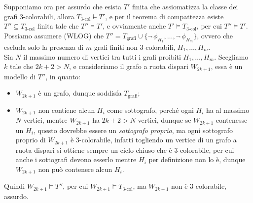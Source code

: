 \begin{soln}
\begin{enumerate}
\begin{center}
        \end{center}
        Supponiamo ora per assurdo che esista $T'$ finita che assiomatizza la classe dei grafi 3-colorabili, allora $T_{\text{3-col}} \models T'$, e per il teorema di compattezza esiste $T'' \subseteq T_{\text{3-col}}$ finita tale che $T'' \models T'$, e ovviamente anche $T' \models T_{\text{3-col}}$, per cui $T'' \models T'$.
        Possiamo assumere (WLOG) che $T'' = T_{\text{grafi}} \cup \{\neg\,\phi_{H_1}, \ldots, \neg\,\phi_{H_m}\}$, ovvero che escluda solo la presenza di $m$ grafi finiti non 3-colorabili, $H_1, \ldots, H_m$.\\
        Sia $N$ il massimo numero di vertici tra tutti i grafi proibiti $H_1, \ldots, H_m$. Scegliamo $k$ tale che $2k+2 > N$, e consideriamo il grafo a ruota dispari $W_{2k+1}$, essa è un modello di $T''$, in quanto:
        \begin{itemize}
            \item $W_{2k+1}$ è un grafo, dunque soddisfa $T_{\text{grafi}}$;
            \item $W_{2k+1}$ non contiene alcun $H_i$ come sottografo, perché ogni $H_i$ ha al massimo $N$ vertici, mentre $W_{2k+1}$ ha $2k+2 > N$ vertici, dunque se $W_{2k+1}$ contenesse un $H_i$, questo dovrebbe essere un \emph{sottografo proprio},
            ma ogni sottografo proprio di $W_{2k+1}$ è 3-colorabile, infatti togliendo un vertice di un grafo a ruota dispari si ottiene sempre un ciclo chiuso che è 3-colorabile, per cui anche i sottografi devono esserlo mentre $H_i$ per definizione non lo è, dunque $W_{2k+1}$ non può contenere alcun $H_i$.
        \end{itemize}
        Quindi $W_{2k+1} \models T''$, per cui $W_{2k+1} \models T_{\text{3-col}}$, ma $W_{2k+1}$ non è 3-colorabile, assurdo.
    \end{enumerate}
    \enlargethispage{2\baselineskip}
\end{soln}

